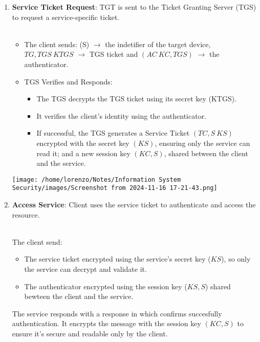 \begin{enumerate}
    \item \textbf{Service Ticket Request}: TGT is sent to the Ticket Granting Server (TGS) to request a service-specific ticket. \\
    \\
    \begin{minipage}{0.5\textwidth}
        \begin{customquote}
        \begin{itemize}
            \item The client sends: (S) \(\rightarrow\) the indetifier of the target device, \({TG,TGS}\ KTGS\) \(\rightarrow\) TGS ticket and \(({AC}\ KC,TGS)\) \(\rightarrow\) the authenticator.
            \item TGS Verifies and Responds: 
            \begin{itemize}
                \item The TGS decrypts the TGS ticket using its secret key (KTGS).
                \item It verifies the client's identity using the authenticator.
                \item If successful, the TGS generates a Service Ticket \(({TC,S}\ KS)\) encrypted with the secret key \((KS)\), ensuring only the service can read it; and a new session key \((KC,S)\), shared between the client and the service.
            \end{itemize}
        \end{itemize}
        \end{customquote}
    \end{minipage} 
    \hspace{1cm}
    \begin{minipage}{0.3\textwidth}
        \centering
        \texttt{[image: /home/lorenzo/Notes/Information System Security/images/Screenshot from 2024-11-16 17-21-43.png]}
    \end{minipage}
    
    \item \textbf{Access Service}: Client uses the service ticket to authenticate and access the resource. \\
    \\
    \begin{minipage}{0.5\textwidth}
        \begin{customquote}
            The client send:
            \begin{itemize}
                \item The service ticket encrypted using the service's secret key (\(KS\)), so only the service can decrypt and validate it. 
                \item The authenticator encrypted using the session key (\(KS,S\)) shared bewteen the client and the service.
        \end{itemize}
            The service responds with a response in which confirms succesfully authentication. It encrypts the message with the session key \((KC,S)\) to ensure it's secure and readable only by the client.
            

\end{customquote}
\end{minipage}
\end{enumerate}
